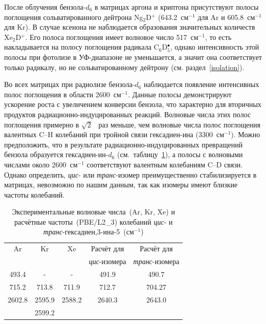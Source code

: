 {После облучения бензола-$d_6$ в матрицах аргона и криптона присутствуют полосы поглощения сольватированного дейтрона Ng$_2$D$^+$ (643.2~см$^{-1}$ для Ar и 605.8~см$^{-1}$ для Kr). В случае  ксенона не наблюдается образования значительных количеств Xe$_2$D$^+$. Его полоса поглощения имеет волновое число 517~см$^{-1}$, то есть накладывается на полосу поглощения радикала C$_6$D$_5^\bullet$, однако интенсивность этой полосы при фотолизе в УФ-диапазоне не уменьшается, а значит она соответствует только радикалу, но не  сольватированному дейтрону (см. раздел~\ref{isolation}).

 Во всех матрицах при радиолизе бензола-$d_6$ наблюдается появление интенсивных полос поглощения в области 2600~см$^{-1}$. Данные полосы демонстрируют ускорение роста с увеличением конверсии бензола, что характерно для вторичных продуктов радиационно-индуцированных реакций.  Волновые числа этих полос поглощения примерно в $\sqrt{2}$~ раз меньше, чем волновые числа полос поглощения валентных C--H колебаний при тройной связи гексадиен-ина (3300~см$^{-1}$).  Можно предположить, что в результате радиационно-индуцированных превращений бензола образуется гексадиен-ин-$d_6$ (см.~таблицу~\ref{135d}), а полосы с волновыми числами около 2600~см$^{-1}$ соответствуют валентным колебаниям C\nobreakdash--D связи. Однако определить, {\it цис}- или {\it транс}-изомер преимущественно стабилизируется в матрицах, невозможно по нашим данным, так как изомеры имеют близкие частоты колебаний.
 
 \begin{table}[H]
\caption{Экспериментальные волновые числа~(Ar, Kr, Xe) и расчётные частоты~(PBE/L2\_3) колебаний {\it цис}- и {\it транс}-гексадиен,3-ина-5~(см$^{-1}$)}
\label{135d}
\begin{center}
\begin{tabular}{ccccc}
Ar & Kr & Xe & Расчёт для  & Расчёт для\\
&&&{\it цис}-изомера&{\it транс}-изомера\\
\hline
493.4 & - & - & 491.9 & 490.7\\
715.2 & 713.8 & 711.9 & 712.7 & 704.27\\
2602.8 & 2595.9 & 2588.2 & 2640.3 & 2643.0\\
 & 2599.2 &  &  & \\
\end{tabular}
\end{center}
\end{table}

}
